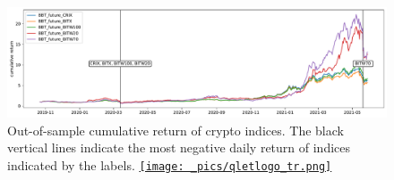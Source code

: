\begin{figure}[t]
\includegraphics[width=\textwidth]{_pics/index_price.pdf}
  \caption{Out-of-sample cumulative return of crypto indices.
  The black vertical lines indicate the most negative daily return of indices indicated by the labels.
  \href{http://www.quantlet.com/}{\texttt{[image: \_pics/qletlogo\_tr.png]}} }
\label{fig:index_price}
\end{figure}

\newpage
